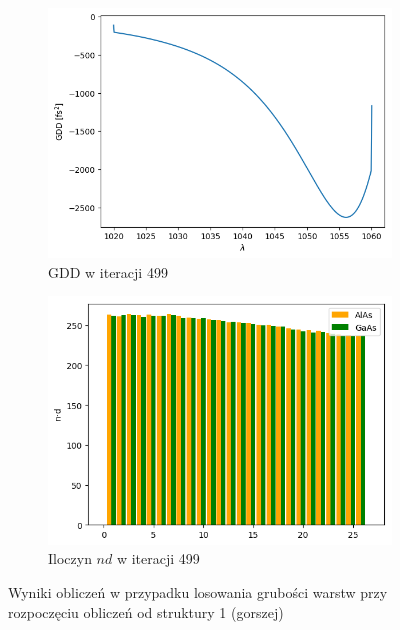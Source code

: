 \begin{figure} [H]
\begin{subfigure}[b]{0.31\textwidth}
        \includegraphics[width=\linewidth]{figures/wyniki/losowe/dbr/result_gddresult499.png}
        \caption{GDD w iteracji 499}
    \end{subfigure}
        \begin{subfigure}[b]{0.32\textwidth}
        \includegraphics[width=\linewidth]{figures/wyniki/losowe/dbr/result_ndresult499.png}
        \caption{Iloczyn $nd$ w iteracji 499}
    \end{subfigure}
    \caption{Wyniki obliczeń w przypadku losowania grubości warstw przy rozpoczęciu obliczeń od struktury 1 (gorszej)}
    \label{fig:wynlos1}
\end{figure}

